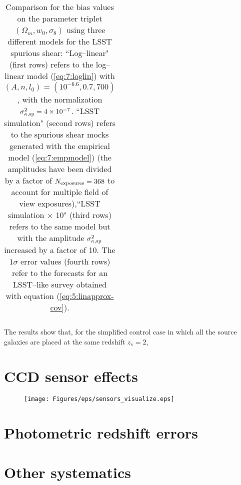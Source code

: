 \begin{table}
\begin{center}
\begin{tabular}{c|ccc}
\end{tabular}
\end{center}

\caption{Comparison for the bias values on the parameter triplet $(\Omega_m,w_0,\sigma_8)$ using three different models for the LSST spurious shear: ``Log--linear" (first rows) refers to the log--linear model (\ref{eq:7:loglin}) with $(A,n,l_0)=(10^{-6.6},0.7,700)$, with the normalization $\sigma^2_{\kappa,{\rm sp}}=4\times10^{-7}$. ``LSST simulation" (second rows) refers to the spurious shear mocks generated with the empirical model (\ref{eq:7:empmodel}) (the amplitudes have been divided by a factor of $N_{\rm exposures}=368$ to account for multiple field of view exposures),``LSST simulation $\times$ 10" (third rows) refers to the same model but with the amplitude $\sigma^2_{\kappa,{\rm sp}}$ increased by a factor of 10. The $1\sigma$ error values (fourth rows) refer to the forecasts for an LSST--like survey obtained with equation (\ref{eq:5:linapprox-cov}).}
\label{tab:7:spbias}
\end{table}
%
The results show that, for the simplified control case in which all the source galaxies are placed at the same redshift $z_s=2$, 

\section{CCD sensor effects}
%
\begin{figure}
\begin{center}
\texttt{[image: Figures/eps/sensors\_visualize.eps]}
\end{center}
\caption{}
\label{fig:7:sensvis}
\end{figure}

\section{Photometric redshift errors}

\section{Other systematics}

